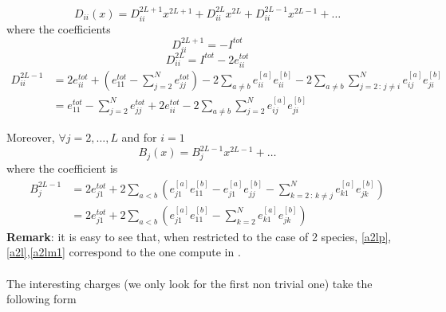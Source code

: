 \documentclass[11pt]{article}
\numberwithin{equation}{section}
\begin{document}
\begin{equation}
	D_{ii}(x)=D_{ii}^{2L+1}x^{2L+1}+D_{ii}^{2L}x^{2L}+D_{ii}^{2L-1}x^{2L-1}+\ldots
\end{equation}
where the coefficients
\begin{equation}\label{a2lp}
	D_{ii}^{2L+1}=-I^{tot}
\end{equation}\begin{equation}\label{a2l}
	D_{ii}^{2L}=I^{tot}-2e_{ii}^{tot}
\end{equation}
\begin{equation}\label{a2lm1}
	\begin{split}
		D_{ii}^{2L-1}&=2e_{ii}^{tot}+\left(e_{11}^{tot}-\sum_{j=2}^{N}e_{jj}^{tot}\right)-2\sum_{a\neq b}e_{ii}^{[a]}e_{ii}^{[b]}-2\sum_{a\neq b}\sum_{j=2\,:\,j\neq i}^{N}e_{ij}^{[a]}e_{ji}^{[b]}\\
		&=e_{11}^{tot}-\sum_{j=2}^{N}e_{jj}^{tot}+2e_{ii}^{tot}-2\sum_{a\neq b}\sum_{j=2}^{N}e_{ij}^{[a]}e_{ji}^{[b]}
	\end{split}
\end{equation}

Moreover, $\forall j=2,\ldots,L$ and for $i=1$
\begin{equation}
	B_{j}(x)=B_{j}^{2L-1}x^{2L-1}+\ldots
\end{equation}
where the coefficient is 
\begin{equation}\label{b}
\begin{split}
	B_{j}^{2L-1}&=2e_{j1}^{tot}+2\sum_{a< b}\left(e_{j1}^{[a]}e_{11}^{[b]}-e_{j1}^{[a]}e_{jj}^{[b]}-\sum_{k=2\,:\,k\neq j}^{N}e_{k1}^{[a]}e_{jk}^{[b]}\right)\\
	&=2e_{j1}^{tot}+2\sum_{a< b}\left(e_{j1}^{[a]}e_{11}^{[b]}-\sum_{k=2}^{N}e_{k1}^{[a]}e_{jk}^{[b]}\right)
	\end{split}
\end{equation}
\textbf{Remark}: it is easy to see that, when restricted to the case of 2 species,  \eqref{a2lp},\eqref{a2l},\eqref{a2lm1} correspond to the one compute in \cite{frassek2020eigenstates}. \\ \\
The interesting charges (we only look for the first non trivial one) take the following form
\end{document}
